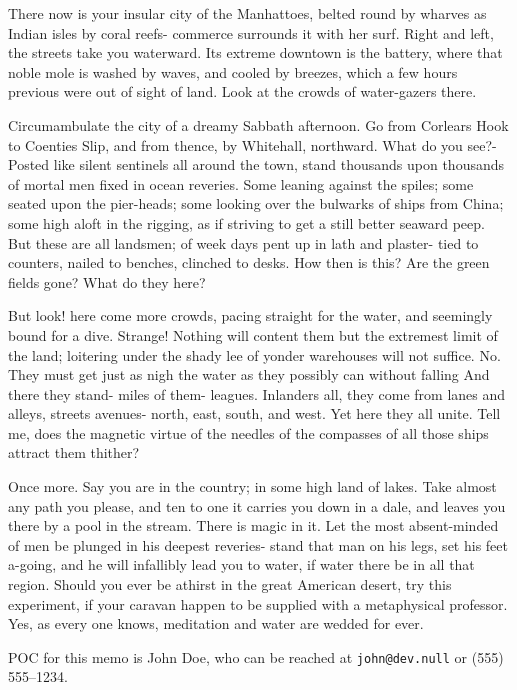 \documentclass{armymemo}
\begin{document}
\Nii{} There now is your insular city of the Manhattoes, belted round by wharves as
Indian isles by coral reefs- commerce surrounds it with her surf. Right and
left, the streets take you waterward. Its extreme downtown is the battery, where
that noble mole is washed by waves, and cooled by breezes, which a few hours
previous were out of sight of land. Look at the crowds of water-gazers there.

\Nii{} Circumambulate the city of a dreamy Sabbath afternoon. Go from Corlears Hook to
Coenties Slip, and from thence, by Whitehall, northward. What do you see?-
Posted like silent sentinels all around the town, stand thousands upon thousands
of mortal men fixed in ocean reveries. Some leaning against the spiles; some
seated upon the pier-heads; some looking over the bulwarks of ships from China;
some high aloft in the rigging, as if striving to get a still better seaward
peep. But these are all landsmen; of week days pent up in lath and plaster- tied
to counters, nailed to benches, clinched to desks. How then is this? Are the
green fields gone? What do they here?

\Nii{} But look! here come more crowds, pacing straight for the water, and seemingly
bound for a dive. Strange! Nothing will content them but the extremest limit of
the land; loitering under the shady lee of yonder warehouses will not suffice.
No. They must get just as nigh the water as they possibly can without falling
And there they stand- miles of them- leagues. Inlanders all, they come from
lanes and alleys, streets avenues- north, east, south, and west. Yet here they
all unite. Tell me, does the magnetic virtue of the needles of the compasses of
all those ships attract them thither?

\Nii{} Once more. Say you are in the country; in some high land of lakes. Take almost
any path you please, and ten to one it carries you down in a dale, and leaves
you there by a pool in the stream. There is magic in it. Let the most
absent-minded of men be plunged in his deepest reveries- stand that man on his
legs, set his feet a-going, and he will infallibly lead you to water, if water
there be in all that region. Should you ever be athirst in the great American
desert, try this experiment, if your caravan happen to be supplied with a
metaphysical professor. Yes, as every one knows, meditation and water are wedded
for ever.

\Ni{} POC for this memo is John Doe, who can be reached at \texttt{john@dev.null}
or (555) 555--1234.

\end{document}
